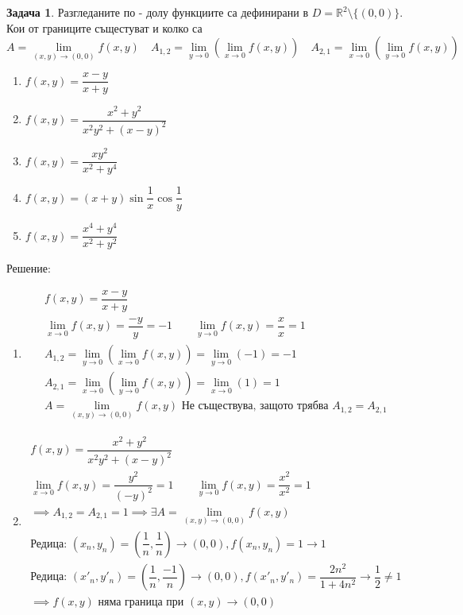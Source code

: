\documentclass[a4paper,fleqn,12pt]{article}
\theoremstyle{definition}
\newtheorem{task}{Задача}[subsection]
\begin{document}
\begin{task}
Разгледаните по - долу функциите са дефинирани в $D = \mathbb{R}^2 \setminus \{ (0,0) \}$. Кои от границите същестуват и колко са
$$
A = \lim\limits_{(x,y) \to (0,0)} f(x,y) \quad
A_{1,2} = \lim\limits_{y \to 0} \left( \lim\limits_{x \to 0} f(x,y) \right) \quad
A_{2,1} = \lim\limits_{x \to 0} \left( \lim\limits_{y \to 0} f(x,y) \right) \quad
$$

\begin{enumerate}

\item $f(x,y) = \dfrac{x-y}{x+y}$
\item $f(x,y) = \dfrac{x^2 + y^2}{x^2y^2 + (x - y)^2}$
\item $f(x,y) = \dfrac{xy^2}{x^2+y^4}$
\item $f(x,y) = (x+y) \sin{\dfrac{1}{x}} \cos{\dfrac{1}{y}}$
\item $f(x,y) = \dfrac{x^4 + y^4}{x^2 + y^2}$

\end{enumerate}
Решение: 

\begin{enumerate}

\item 
\begin{gather*}
f(x,y) = \dfrac{x-y}{x+y} \\
\lim\limits_{x \to 0} f(x,y) = \dfrac{-y}{y} = -1 \qquad 
\lim\limits_{y \to 0} f(x,y) = \dfrac{x}{x} = 1 \\
A_{1,2} = \lim\limits_{y \to 0} \left( \lim\limits_{x \to 0} f(x,y) \right) = \lim\limits_{y \to 0} \left( -1 \right) = -1\\
A_{2,1} = \lim\limits_{x \to 0} \left( \lim\limits_{y \to 0} f(x,y) \right) = \lim\limits_{x \to 0} \left( 1 \right) = 1 \\
A = \lim\limits_{(x,y) \to (0,0)} f(x,y) \text{ Не съществува, защото трябва }A_{1,2} = A_{2,1}
\end{gather*}

\item 
\begin{gather*}
f(x,y) = \dfrac{x^2 + y^2}{x^2y^2 + (x - y)^2}\\
\lim\limits_{x \to 0} f(x,y) = \dfrac{y^2}{(-y)^2} = 1 \qquad 
\lim\limits_{y \to 0} f(x,y) = \dfrac{x^2}{x^2} = 1 \\
\implies A_{1,2} = A_{2,1} = 1 \implies \exists A = \lim\limits_{(x,y) \to (0,0)} f(x,y)\\
\text{Редица: }(x_n, y_n) = \left (\dfrac{1}{n},\dfrac{1}{n}\right ) \to (0,0), f(x_n, y_n) = 1 \to 1\\
\text{Редица: }(x'_n, y'_n) = \left (\dfrac{1}{n},\dfrac{-1}{n}\right )  \to (0,0), f(x'_n, y'_n) = \dfrac{2n^2}{1 + 4n^2} \to \dfrac{1}{2} \neq 1 \\
\implies f(x,y) \text{ няма граница при } (x,y) \to (0,0)
\end{gather*}


\end{enumerate}
\end{task}
\end{document}
